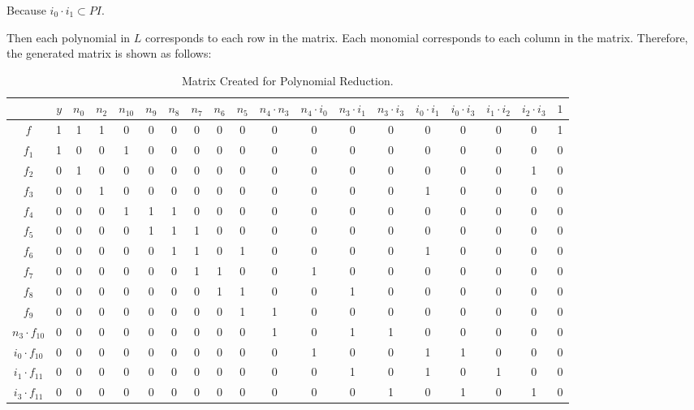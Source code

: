 \begin{Example}
	Because $i_0\cdot i_1  \subset PI$.
	
	Then each polynomial in $L$ corresponds to each row in the matrix.
	Each monomial corresponds to each column in the matrix.
	Therefore, the generated matrix is shown as follows:
	
	\begin{table} 
	\begin{center}
	\caption{Matrix Created for Polynomial Reduction.} 
	\label{tab:ourmas}
	\begin{tabular}{|c||c|c|c|c|c|c|c|c|c|c|c|c|c|c|c|c|c|c|} \hline 
				&$y$ 	&$n_0$ &$n_2$	&$n_{10}$	&$n_9$	&$n_8$  &$n_7$	&$n_6$  &$n_5$   &$n_4\cdot n_3$  &$n_4\cdot i_0$ 	&$n_3\cdot i_1$	&$n_3\cdot i_3$	&$i_0\cdot i_1$		&$i_0\cdot i_3$ 	&$i_1\cdot i_2$	 &$i_2\cdot i_3$   &$1$ \\
		\hline
		$f$   		&1	&1	&1	&0	&0	&0	&0	&0	&0	&0	&0	&0	&0	&0	&0	&0	&0	&1 \\
		\hline
		$f_1$ 		&1	&0	&0	&1	&0	&0	&0	&0	&0	&0	&0	&0	&0	&0	&0	&0	&0	&0 \\
		\hline
		$f_2$ 		&0	&1	&0	&0	&0	&0	&0	&0	&0	&0	&0	&0	&0	&0	&0	&0	&1	&0 \\
		\hline
		$f_3$		&0	&0	&1	&0	&0	&0	&0	&0	&0	&0	&0	&0	&0	&1	&0	&0	&0	&0 \\
		\hline
		$f_4$		&0	&0	&0	&1	&1	&1	&0	&0	&0	&0	&0	&0	&0	&0	&0	&0	&0	&0\\
		\hline{}
		$f_5$		&0	&0	&0	&0	&1	&1	&1	&0	&0	&0	&0	&0	&0	&0	&0	&0	&0	&0\\
		\hline{}
		$f_6$		&0	&0	&0	&0	&0	&1	&1	&0	&1	&0	&0	&0	&0	&1	&0	&0	&0	&0\\
		\hline{}
		$f_7$		&0	&0	&0	&0	&0	&0	&1	&1	&0	&0	&1	&0	&0	&0	&0	&0	&0	&0\\
		\hline{}
		$f_8$		&0	&0	&0	&0	&0	&0	&0	&1	&1	&0	&0	&1	&0	&0	&0	&0	&0	&0\\
		\hline{}
		$f_9$		&0	&0	&0	&0	&0	&0	&0	&0	&1	&1	&0	&0	&0	&0	&0	&0	&0	&0\\
	\hline{}
$n_3\cdot f_{10}$	&0	&0	&0	&0	&0	&0	&0	&0	&0	&1	&0	&1	&1	&0	&0	&0	&0	&0\\
	\hline{}
$i_0\cdot f_{10}$ 	&0	&0	&0	&0	&0	&0	&0	&0	&0	&0	&1	&0	&0	&1	&1	&0	&0	&0\\
	\hline{}
$i_1 \cdot f_{11}$	&0	&0	&0	&0	&0	&0	&0	&0	&0	&0	&0	&1	&0	&1	&0	&1	&0	&0\\
	\hline{}
$i_3 \cdot f_{11}$	&0	&0	&0	&0	&0	&0	&0	&0	&0	&0	&0	&0	&1	&0	&1	&0	&1	&0\\
	\hline
	\end{tabular}
	\end{center}
	\end{table} 
	

\end{Example}
